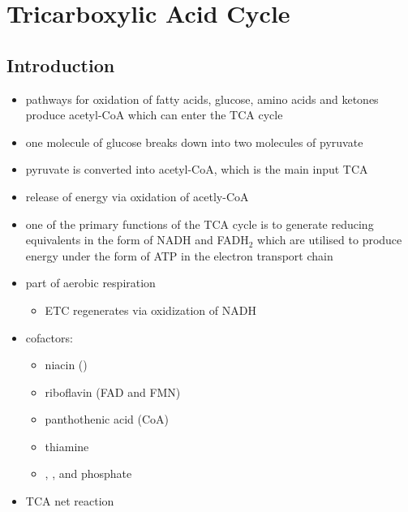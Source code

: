 \documentclass{scrartcl}
\begin{document}
\section{Tricarboxylic Acid Cycle}
\label{sec:orgb2fd92e}
\subsection{Introduction}
\label{sec:orgf7d41c7}
\begin{itemize}
\item pathways for oxidation of fatty acids, glucose, amino acids and
ketones produce acetyl-CoA which can enter the TCA cycle
\item one molecule of glucose breaks down into two molecules of pyruvate
\item pyruvate is converted into acetyl-CoA, which is the main input TCA
\item release of energy via oxidation of acetly-CoA
\item one of the primary functions of the TCA cycle is to generate
reducing equivalents in the form of NADH and FADH\(_{\text{2}}\) which are
utilised to produce energy under the form of ATP in the electron
transport chain
\end{itemize}

\centering
{}
\begin{itemize}
\item part of aerobic respiration
\begin{itemize}
\item ETC regenerates  via oxidization of NADH
\end{itemize}
\item cofactors:
\begin{itemize}
\item niacin ()
\item riboflavin (FAD and FMN)
\item panthothenic acid (CoA)
\item thiamine
\item {}, ,  and phosphate
\end{itemize}

\item TCA net reaction
\end{itemize}
\end{document}
